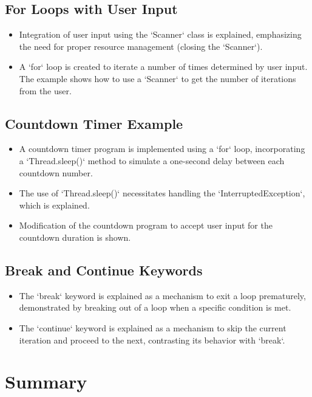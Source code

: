 \documentclass{article}
\begin{document}
\subsection{For Loops with User Input}

\begin{itemize}
    \item  Integration of user input using the `Scanner` class is explained, emphasizing the need for proper resource management (closing the `Scanner`).
    \item A `for` loop is created to iterate a number of times determined by user input.  The example shows how to use a `Scanner` to get the number of iterations from the user.
\end{itemize}

\subsection{Countdown Timer Example}

\begin{itemize}
    \item A countdown timer program is implemented using a `for` loop, incorporating a `Thread.sleep()` method to simulate a one-second delay between each countdown number.
    \item The use of `Thread.sleep()` necessitates handling the `InterruptedException`, which is explained.
    \item Modification of the countdown program to accept user input for the countdown duration is shown.
\end{itemize}

\subsection{Break and Continue Keywords}

\begin{itemize}
    \item The `break` keyword is explained as a mechanism to exit a loop prematurely, demonstrated by breaking out of a loop when a specific condition is met.
    \item The `continue` keyword is explained as a mechanism to skip the current iteration and proceed to the next, contrasting its behavior with `break`.
\end{itemize}


\section{Summary}
\end{document}
